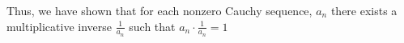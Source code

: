 \documentclass[preview]{standalone}
\begin{document}
\begin{center}
Thus, we have shown that for each nonzero Cauchy sequence, $a_n$ there exists a multiplicative inverse $\frac{1}{a_n}$ such that $a_n \cdot \frac{1}{a_n} = 1$
\end{center}
\end{document}
